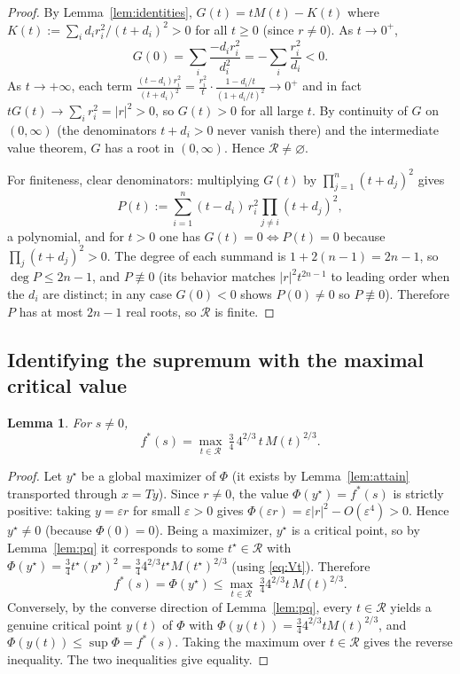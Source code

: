 \documentclass{amsart}
\newtheorem{lemma}{Lemma}
\theoremstyle{definition}
\begin{document}
\begin{proof}
By Lemma~\ref{lem:identities}, $G(t)=tM(t)-K(t)$ where $K(t):=\sum_i d_i r_i^2/(t+d_i)^2>0$ for all $t\ge0$ (since $r\ne0$). As $t\to0^+$,
\[
G(0)=\sum_i\frac{-d_i r_i^2}{d_i^2}=-\sum_i\frac{r_i^2}{d_i}<0 .
\]
As $t\to+\infty$, each term $\frac{(t-d_i)r_i^2}{(t+d_i)^2}=\frac{r_i^2}{t}\cdot\frac{1-d_i/t}{(1+d_i/t)^2}\to0^+$ and in fact $tG(t)\to\sum_i r_i^2=|r|^2>0$, so $G(t)>0$ for all large $t$. By continuity of $G$ on $(0,\infty)$ (the denominators $t+d_i>0$ never vanish there) and the intermediate value theorem, $G$ has a root in $(0,\infty)$. Hence $\mathcal R\ne\varnothing$.

For finiteness, clear denominators: multiplying $G(t)$ by $\prod_{j=1}^n(t+d_j)^2$ gives
\begin{equation}\label{eq:poly}
P(t):=\sum_{i=1}^n (t-d_i)\,r_i^2\prod_{j\ne i}(t+d_j)^2 ,
\end{equation}
a polynomial, and for $t>0$ one has $G(t)=0\iff P(t)=0$ because $\prod_j(t+d_j)^2>0$. The degree of each summand is $1+2(n-1)=2n-1$, so $\deg P\le 2n-1$, and $P\not\equiv0$ (its behavior matches $|r|^2 t^{2n-1}$ to leading order when the $d_i$ are distinct; in any case $G(0)<0$ shows $P(0)\ne0$ so $P\not\equiv0$). Therefore $P$ has at most $2n-1$ real roots, so $\mathcal R$ is finite.
\end{proof}

\subsection{Identifying the supremum with the maximal critical value}

\begin{lemma}\label{lem:maxroot}
For $s\ne0$,
\[
f^*(s)=\max_{t\in\mathcal R}\ \tfrac34\,4^{2/3}\,t\,M(t)^{2/3}.
\]
\end{lemma}

\begin{proof}
Let $y^\star$ be a global maximizer of $\Phi$ (it exists by Lemma~\ref{lem:attain} transported through $x=Ty$). Since $r\ne0$, the value $\Phi(y^\star)=f^*(s)$ is strictly positive: taking $y=\varepsilon r$ for small $\varepsilon>0$ gives $\Phi(\varepsilon r)=\varepsilon|r|^2-O(\varepsilon^4)>0$. Hence $y^\star\ne0$ (because $\Phi(0)=0$). Being a maximizer, $y^\star$ is a critical point, so by Lemma~\ref{lem:pq} it corresponds to some $t^\star\in\mathcal R$ with $\Phi(y^\star)=\tfrac34 t^\star (p^\star)^2=\tfrac34 4^{2/3}t^\star M(t^\star)^{2/3}$ (using \eqref{eq:Vt}). Therefore
\[
f^*(s)=\Phi(y^\star)\le \max_{t\in\mathcal R}\ \tfrac34 4^{2/3} t\,M(t)^{2/3}.
\]
Conversely, by the converse direction of Lemma~\ref{lem:pq}, every $t\in\mathcal R$ yields a genuine critical point $y(t)$ of $\Phi$ with $\Phi(y(t))=\tfrac34 4^{2/3} t M(t)^{2/3}$, and $\Phi(y(t))\le\sup\Phi=f^*(s)$. Taking the maximum over $t\in\mathcal R$ gives the reverse inequality. The two inequalities give equality.
\end{proof}
\end{document}
